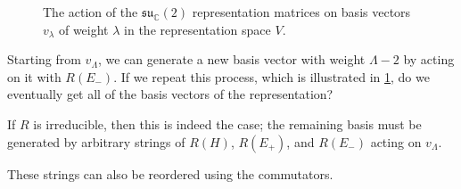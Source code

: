 \begin{figure}[tbhp]
  \centering
  \def\svgwidth{0.9\columnwidth}
  
  \caption{The action of the $\mathfrak{su}_{\mathbb{C}}(2)$ representation matrices on basis vectors $v_{\lambda}$ of weight $\lambda$ in the representation space $V$.}
  \label{fig:l11f1}
\end{figure}

Starting from $v_{\Lambda}$, we can generate a new basis vector with weight $\Lambda -2$ by acting on it with $R(E_-)$. If we repeat this process, which is illustrated in \ref{fig:l11f1}, do we eventually get all of the basis vectors of the representation?
\begin{claim}
If $R$ is irreducible, then this is indeed the case; the remaining basis must be generated by arbitrary strings of $R(H)$, $R(E_+)$, and $R(E_-)$ acting on $v_\Lambda$.
\end{claim}
\begin{leftbar}
  \begin{remark}
    These strings can also be reordered using the commutators.
  \end{remark}
\end{leftbar}
